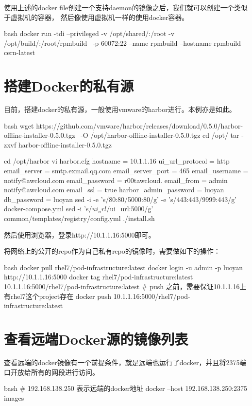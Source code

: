 使用上述的docker file创建一个支持daemon的镜像之后，我们就可以创建一个类似于虚拟机的容器，
然后像使用虚拟机一样的使用docker容器。
\begin{code-block}{bash}
docker run -tdi --privileged -v /opt/shared/:/root -v /opt/build/:/root/rpmbuild \
    -p 60072:22 --name rpmbuild --hostname rpmbuild cern-latest
\end{code-block}

\section{搭建Docker的私有源}
目前，搭建docker的私有源，一般使用vmware的harbor进行。本例亦是如此。
\begin{code-block}{bash}
wget https://github.com/vmware/harbor/releases/download/0.5.0/harbor-offline-installer-0.5.0.tgz \
    -O /opt/harbor-offline-installer-0.5.0.tgz
cd /opt/
tar -zxvf harbor-offline-installer-0.5.0.tgz

cd /opt/harbor
vi harbor.cfg
hostname = 10.1.1.16
ui_url_protocol = http
email_server = smtp.exmail.qq.com
email_server_port = 465
email_username = notify@awcloud.com
email_password = r00tawcloud.
email_from = admin notify@awcloud.com
email_ssl = true
harbor_admin_password = luoyan
db_password = luoyan
sed -i -e 's/80:80/5000:80/g' -e 's/443:443/9999:443/g' docker-compose.yml
sed -i 's/$ui_url/$ui_url:5000/g' common/templates/registry/config.yml
./install.sh
\end{code-block}

然后使用浏览器，登录http://10.1.1.16:5000即可。

将网络上的公开的repo作为自己私有repo的镜像时，需要做如下的操作：
\begin{code-block}{bash}
docker pull rhel7/pod-infrastructure:latest
docker login -u admin -p luoyan http://10.1.1.16:5000
docker tag rhel7/pod-infrastructure:latest 10.1.1.16:5000/rhel7/pod-infrastructure:latest
# push 之前，需要保证10.1.1.16上有rhel7这个project存在
docker push 10.1.1.16:5000/rhel7/pod-infrastructure:latest
\end{code-block}

\section{查看远端Docker源的镜像列表}
查看远端的docker镜像有一个前提条件，就是远端也运行了docker，并且将2375端口开放给所有的网段进行访问。
\begin{code-block}{bash}
# 192.168.138.250 表示远端的docker地址
docker --host 192.168.138.250:2375 images
\end{code-block}

